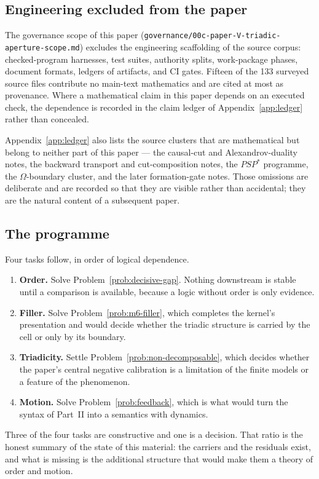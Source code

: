 \subsection{Engineering excluded from the paper}

The governance scope of this paper
(\texttt{governance/00c-paper-V-triadic-aperture-scope.md}) excludes the engineering
scaffolding of the source corpus: checked-program harnesses, test suites, authority splits,
work-package phases, document formats, ledgers of artifacts, and CI gates.  Fifteen of the
133 surveyed source files contribute no main-text mathematics and are cited at most as
provenance.  Where a mathematical claim in this paper depends on an executed check, the
dependence is recorded in the claim ledger of Appendix~\ref{app:ledger} rather than
concealed.

Appendix~\ref{app:ledger} also lists the source clusters that are mathematical but belong to
neither part of this paper --- the causal-cut and Alexandrov-duality notes, the backward
transport and cut-composition notes, the $PSP^{\ast}$ programme, the $\Omega$-boundary
cluster, and the later formation-gate notes.  Those omissions are deliberate and are recorded
so that they are visible rather than accidental; they are the natural content of a subsequent
paper.

\subsection{The programme}

Four tasks follow, in order of logical dependence.

\begin{enumerate}
\item \textbf{Order.}  Solve Problem~\ref{prob:decisive-gap}.  Nothing downstream is stable
  until a comparison is available, because a logic without order is only evidence.
\item \textbf{Filler.}  Solve Problem~\ref{prob:m6-filler}, which completes the kernel's
  presentation and would decide whether the triadic structure is carried by the cell or only
  by its boundary.
\item \textbf{Triadicity.}  Settle Problem~\ref{prob:non-decomposable}, which decides
  whether the paper's central negative calibration is a limitation of the finite models or a
  feature of the phenomenon.
\item \textbf{Motion.}  Solve Problem~\ref{prob:feedback}, which is what would turn the
  syntax of Part~II into a semantics with dynamics.
\end{enumerate}

\begin{remark}
Three of the four tasks are constructive and one is a decision.  That ratio is the honest
summary of the state of this material: the carriers and the residuals exist, and what is
missing is the additional structure that would make them a theory of order and motion.
\end{remark}
